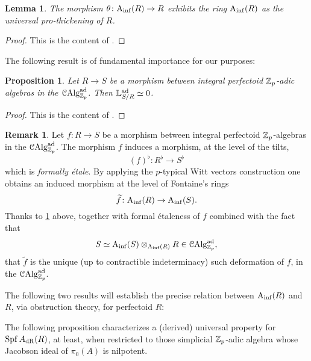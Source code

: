 \documentclass[10pt,a4paper]{amsart}
\numberwithin{equation}{subsection}
\newtheorem{lemma}[theorem]{Lemma}
\newtheorem{proposition}[theorem]{Proposition}
\theoremstyle{definition}
\newtheorem{remark}[theorem]{Remark}
\begin{document}
\begin{lemma} \label{pro_thick}
    The morphism $\theta \colon \mathrm{A}_{\mathrm{inf}}(R) \to R$ exhibits the ring $\mathrm{A}_{\mathrm{inf}}(R)$ as the universal pro-thickening of $R$.
\end{lemma}

\begin{proof}
    This is the content of \cite[Proposition 3.14]{szamuely2016p}. 
\end{proof}

The following result is of fundamental importance for our purposes:

\begin{proposition} \label{prop_non_obs_perf}
    Let $R \to S$ be a morphism between integral perfectoid $\mathbb Z_p$-adic algebras in the \infcat $\mathcal C \mathrm{Alg}^{\mathrm{ad}}_{\mathbb Z_p}$. Then $\mathbb{L}^{\mathrm{ad}}_{S/R} \simeq 0$.
\end{proposition}

\begin{proof}
    This is the content of \cite[Proposition 3.14]{bhatt2018integral}.
\end{proof}

\begin{remark}
    Let $f \colon R \to S$ be a morphism between integral perfectoid $\mathbb Z_p$-algebras in the \infcat $\mathcal C \mathrm{Alg}^{\mathrm{ad}}_{\mathbb Z_p}$. The morphism $f$ induces a morphism, at the level of the tilts,
        \[
            (f)^\flat \colon R^\flat \to S^\flat  
        \]
    which is \emph{formally \'etale}. By applying the $p$-typical Witt vectors construction one obtains an induced morphism at the level of Fontaine's rings
        \[
            \widetilde{f} \colon \mathrm{A}_{\mathrm{inf}}(R) \to \mathrm{A}_{\mathrm{inf}}(S). 
        \]
    Thanks to \cref{pro_thick} above,
    \cite[Proposition 8.4.2.5, see also Remark 8.4.2.3]{Lurie_Higher_algebra} together with formal \'etaleness of $f$ combined with the fact that 
        \[
            S \simeq  \mathrm{A}_{\mathrm{inf}}(S) \otimes_{\mathrm{A}_{\mathrm{inf}}(R)} R \in \mathcal C \mathrm{Alg}^{\mathrm{ad}}_{\mathbb Z_p},
        \]
    that $\widetilde{f}$ is the unique (up to contractible indeterminacy) such deformation of $f$, in the \infcat $\mathcal C \mathrm{Alg}^{\mathrm{ad}}_{\mathbb Z_p}$.
\end{remark}


The following two results will establish the precise relation between $\mathrm{A}_{\mathrm{inf}}(R) $ and $R$, via obstruction theory, for perfectoid $R$:

The following proposition characterizes a (derived) universal property for $\operatorname{Spf} A_{\mathrm{dR}}(R)$, at least, when restricted to those simplicial $\mathbb Z_p$-adic algebra whose Jacobson ideal of $\pi_0(A)$ is nilpotent.
\end{document}
